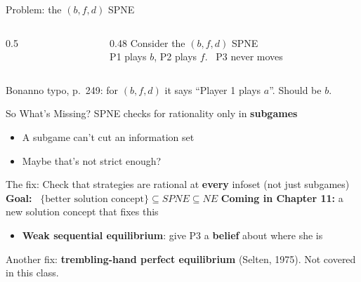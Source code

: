 \begin{frame}{Problem: the $(b,f,d)$ SPNE}
\begin{columns}[c]
\begin{column}{0.5\textwidth}
\centering
\horse
\end{column}
\begin{column}{0.48\textwidth}
Consider the $(b,f,d)$ SPNE\\[4pt]
P1 plays $b$, P2 plays $f$. \ P3 never moves
\bsk
{}
\bsk
{}
\end{column}
\end{columns}
\bsk
{}
\vfill
{\footnotesize Bonanno typo, p.~249: for $(b,f,d)$ it says ``Player 1 plays $a$''. Should be $b$.}
\vspace{-0.2in}
\end{frame}

\begin{frame}{So What's Missing?}
SPNE checks for rationality only in \textbf{subgames}
\begin{itemize}
    \item A subgame can't cut an information set
    \item Maybe that's not strict enough?
\end{itemize}
\bsk
The fix: Check that strategies are rational at \textbf{every} infoset (not just subgames)
\bsk
\textbf{Goal:} \ $\{\text{better solution concept}\}\subseteq SPNE\subseteq NE$
\bsk
\textbf{Coming in Chapter 11:} a new solution concept that fixes this
\begin{itemize}
    \item \textbf{Weak sequential equilibrium}: give P3 a \textbf{belief} about where she is
\end{itemize}
\vfill
{\footnotesize Another fix: \textbf{trembling-hand perfect equilibrium} (Selten, 1975). Not covered in this class.}
\vspace{-0.2in}
\end{frame}

